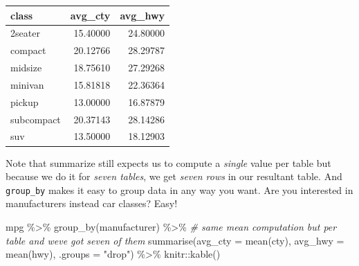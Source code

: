 \documentclass[
]{book}
\newenvironment{Shaded}{\begin{snugshade}}{\end{snugshade}}
\newcommand{\AttributeTok}[1]{\textcolor[rgb]{0.77,0.63,0.00}{#1}}
\newcommand{\CommentTok}[1]{\textcolor[rgb]{0.56,0.35,0.01}{\textit{#1}}}
\newcommand{\FunctionTok}[1]{\textcolor[rgb]{0.00,0.00,0.00}{#1}}
\newcommand{\NormalTok}[1]{#1}
\newcommand{\SpecialCharTok}[1]{\textcolor[rgb]{0.00,0.00,0.00}{#1}}
\newcommand{\StringTok}[1]{\textcolor[rgb]{0.31,0.60,0.02}{#1}}
\begin{document}
\begin{tabular}{l|r|r}
\hline
class & avg\_cty & avg\_hwy\\
\hline
2seater & 15.40000 & 24.80000\\
\hline
compact & 20.12766 & 28.29787\\
\hline
midsize & 18.75610 & 27.29268\\
\hline
minivan & 15.81818 & 22.36364\\
\hline
pickup & 13.00000 & 16.87879\\
\hline
subcompact & 20.37143 & 28.14286\\
\hline
suv & 13.50000 & 18.12903\\
\hline
\end{tabular}

Note that summarize still expects us to compute a \emph{single} value per table but because we do it for \emph{seven tables}, we get \emph{seven rows} in our resultant table. And \texttt{group\_by} makes it easy to group data in any way you want. Are you interested in manufacturers instead car classes? Easy!

\begin{Shaded}
\begin{Highlighting}[]
\NormalTok{mpg }\SpecialCharTok{\%\textgreater{}\%}
  \FunctionTok{group\_by}\NormalTok{(manufacturer)  }\SpecialCharTok{\%\textgreater{}\%}
  \CommentTok{\# same mean computation but per table and we\textquotesingle{}ve got seven of them}
  \FunctionTok{summarise}\NormalTok{(}\AttributeTok{avg\_cty =} \FunctionTok{mean}\NormalTok{(cty),}
            \AttributeTok{avg\_hwy =} \FunctionTok{mean}\NormalTok{(hwy), }\AttributeTok{.groups =} \StringTok{"drop"}\NormalTok{) }\SpecialCharTok{\%\textgreater{}\%}
\NormalTok{  knitr}\SpecialCharTok{::}\FunctionTok{kable}\NormalTok{()}
\end{Highlighting}
\end{Shaded}
\end{document}
